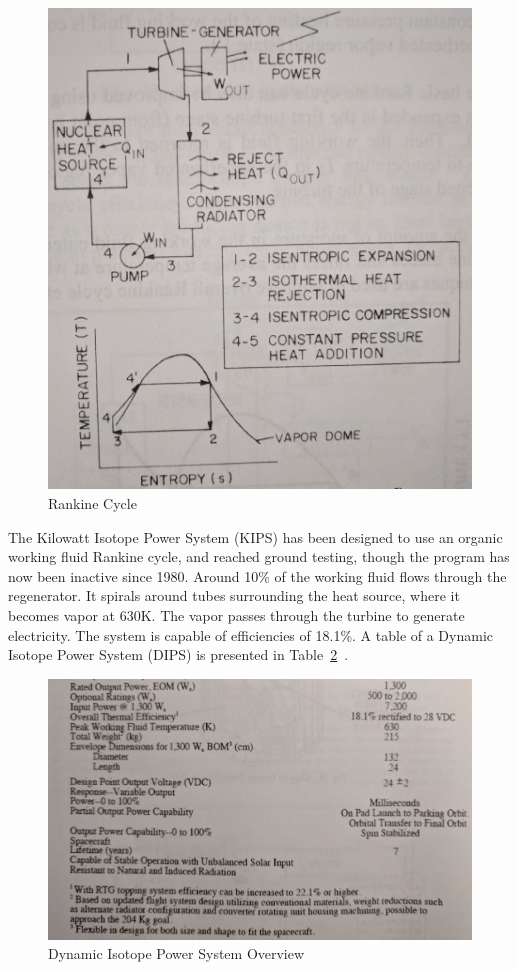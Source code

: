 \documentclass{article}
\begin{document}
\begin{figure}[]
	\centering
	\includegraphics[height=0.45\textheight]{fig/figure3}
	\caption[Rankine Cycle]{Rankine Cycle~\cite{buden2011spacebook1}}
	\label{figure3}
\end{figure}


The Kilowatt Isotope Power System (KIPS) has been designed to use an organic working fluid Rankine cycle, and reached ground testing, though the program has now been inactive since 1980. Around 10\% of the working fluid flows through the regenerator. It spirals around tubes surrounding the heat source, where it becomes vapor at 630K. The vapor passes through the turbine to generate electricity. The system is capable of efficiencies of 18.1\%. A table of a Dynamic Isotope Power System (DIPS) is presented in Table~\ref{table7}~\cite{pearson1988dynamic}.

\begin{figure}[]
	\centering
	\includegraphics[height=0.45\textheight]{fig/table7}
	\caption[Dynamic Isotope Power System Overview]{Dynamic Isotope Power System Overview~\cite{buden2011spacebook1}}
	\label{table7}
\end{figure}
\end{document}
